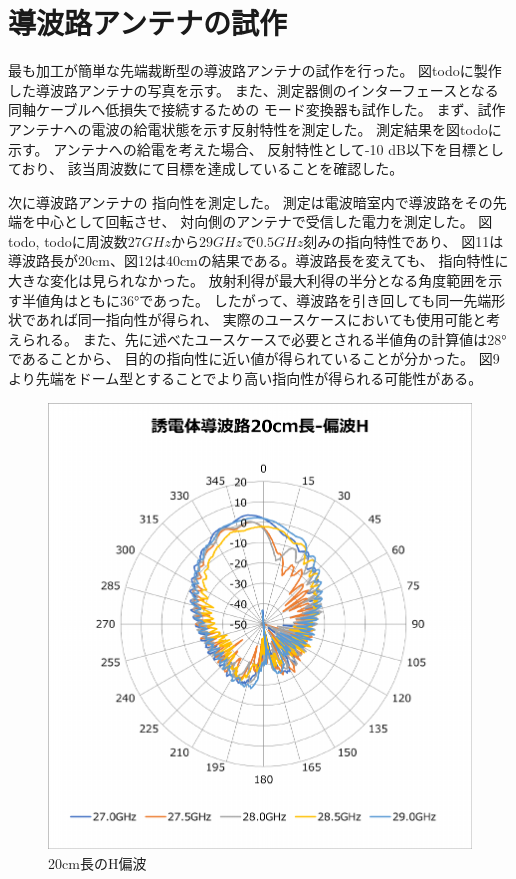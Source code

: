 \documentclass[technicalreport]{ieicej}
\begin{document}
\section{導波路アンテナの試作}

最も加工が簡単な先端裁断型の導波路アンテナの試作を行った。
図todoに製作した導波路アンテナの写真を示す。
また、測定器側のインターフェースとなる同軸ケーブルへ低損失で接続するための
モード変換器も試作した。
まず、試作アンテナへの電波の給電状態を示す反射特性を測定した。
測定結果を図todoに示す。
アンテナへの給電を考えた場合、
反射特性として-10 dB以下を目標としており、
該当周波数にて目標を達成していることを確認した。

次に導波路アンテナの
指向性を測定した。
測定は電波暗室内で導波路をその先端を中心として回転させ、
対向側のアンテナで受信した電力を測定した。
図todo, todoに周波数$27GHz$から$29GHz$で$0.5 GHz$刻みの指向特性であり、
図11は導波路長が20cm、図12は40cmの結果である。導波路長を変えても、
指向特性に大きな変化は見られなかった。
放射利得が最大利得の半分となる角度範囲を示す半値角はともに36°であった。
したがって、導波路を引き回しても同一先端形状であれば同一指向性が得られ、
実際のユースケースにおいても使用可能と考えられる。
また、先に述べたユースケースで必要とされる半値角の計算値は28°であることから、
目的の指向性に近い値が得られていることが分かった。
図9より先端をドーム型とすることでより高い指向性が得られる可能性がある。

\begin{figure}[tb]
  \begin{center}
    \includegraphics[bb=0 0 408 430, width=0.9\linewidth]{img/waveguide-20cm-h.pdf}
    \caption{20cm長のH偏波}
    \label{fig:20cm-h}
  \end{center}
\end{figure}
\end{document}
